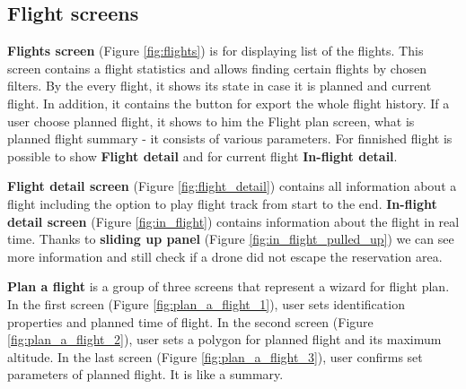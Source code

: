 \subsection{Flight screens}\label{subsec:flight-screens}
\textbf{Flights screen} (Figure \ref{fig:flights}) is for displaying list of the flights.
This screen contains a flight statistics and allows finding certain flights by chosen filters.
By the every flight, it shows its state in case it is planned and current flight.
In addition, it contains the button for export the whole flight history.
If a user choose planned flight, it shows to him the Flight plan screen, what is planned flight summary - it consists of various parameters.
For finnished flight is possible to show \textbf{Flight detail} and for current flight \textbf{In-flight detail}.

\textbf{Flight detail screen} (Figure \ref{fig:flight_detail}) contains all information about a flight including the option to play flight track from start to the end.
\textbf{In-flight detail screen} (Figure \ref{fig:in_flight}) contains information about the flight in real time.
Thanks to \textbf{sliding up panel} (Figure \ref{fig:in_flight_pulled_up}) we can see more information and still check if a drone did not escape the reservation area.

\textbf{Plan a flight} is a group of three screens that represent a wizard for flight plan.
In the first screen (Figure \ref{fig:plan_a_flight_1}), user sets identification properties and planned time of flight.
In the second screen (Figure \ref{fig:plan_a_flight_2}), user sets a polygon for planned flight and its maximum altitude.
In the last screen (Figure \ref{fig:plan_a_flight_3}), user confirms set parameters of planned flight.
It is like a summary.


